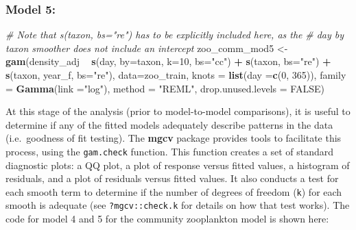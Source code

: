 \documentclass[12pt]{article}
\newenvironment{Shaded}{\begin{snugshade}}{\end{snugshade}}
\newcommand{\KeywordTok}[1]{\textcolor[rgb]{0.13,0.29,0.53}{\textbf{#1}}}
\newcommand{\DataTypeTok}[1]{\textcolor[rgb]{0.13,0.29,0.53}{#1}}
\newcommand{\DecValTok}[1]{\textcolor[rgb]{0.00,0.00,0.81}{#1}}
\newcommand{\StringTok}[1]{\textcolor[rgb]{0.31,0.60,0.02}{#1}}
\newcommand{\CommentTok}[1]{\textcolor[rgb]{0.56,0.35,0.01}{\textit{#1}}}
\newcommand{\OtherTok}[1]{\textcolor[rgb]{0.56,0.35,0.01}{#1}}
\newcommand{\OperatorTok}[1]{\textcolor[rgb]{0.81,0.36,0.00}{\textbf{#1}}}
\newcommand{\NormalTok}[1]{#1}
\begin{document}
\subsubsection{Model 5:}\label{model-5-1}

\begin{Shaded}
\begin{Highlighting}[]
\CommentTok{# Note that  s(taxon, bs="re") has to be explicitly included here, as the }
\CommentTok{# day  by taxon smoother does not include an intercept}
\NormalTok{zoo_comm_mod5 <-}\StringTok{ }\KeywordTok{gam}\NormalTok{(density_adj }\OperatorTok{~}\StringTok{ }\KeywordTok{s}\NormalTok{(day, }\DataTypeTok{by=}\NormalTok{taxon,}
                                     \DataTypeTok{k=}\DecValTok{10}\NormalTok{, }\DataTypeTok{bs=}\StringTok{"cc"}\NormalTok{) }\OperatorTok{+}\StringTok{ }
\StringTok{                                   }\KeywordTok{s}\NormalTok{(taxon, }\DataTypeTok{bs=}\StringTok{"re"}\NormalTok{) }\OperatorTok{+}
\StringTok{                                   }\KeywordTok{s}\NormalTok{(taxon, year_f, }\DataTypeTok{bs=}\StringTok{"re"}\NormalTok{),}
                     \DataTypeTok{data=}\NormalTok{zoo_train,}
                     \DataTypeTok{knots =} \KeywordTok{list}\NormalTok{(}\DataTypeTok{day =}\KeywordTok{c}\NormalTok{(}\DecValTok{0}\NormalTok{, }\DecValTok{365}\NormalTok{)),}
                     \DataTypeTok{family =} \KeywordTok{Gamma}\NormalTok{(}\DataTypeTok{link =}\StringTok{"log"}\NormalTok{), }
                     \DataTypeTok{method =} \StringTok{"REML"}\NormalTok{,}
                     \DataTypeTok{drop.unused.levels =} \OtherTok{FALSE}\NormalTok{)}
\end{Highlighting}
\end{Shaded}

At this stage of the analysis (prior to model-to-model comparisons), it
is useful to determine if any of the fitted models adequately describe
patterns in the data (i.e.~goodness of fit testing). The \textbf{mgcv}
package provides tools to facilitate this process, using the
\texttt{gam.check} function. This function creates a set of standard
diagnostic plots: a QQ plot, a plot of response versus fitted values, a
histogram of residuals, and a plot of residuals versus fitted values. It
also conducts a test for each smooth term to determine if the number of
degrees of freedom (\texttt{k}) for each smooth is adequate (see
\texttt{?mgcv::check.k} for details on how that test works). The code
for model 4 and 5 for the community zooplankton model is shown here:
\end{document}
